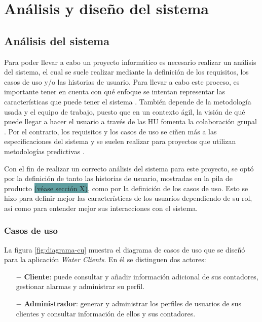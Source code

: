 \documentclass[pdftex,11pt,a4paper]{book}
\begin{document}

\chapter{Análisis y diseño del sistema}

\section{Análisis del sistema}

Para poder llevar a cabo un proyecto informático es necesario realizar un análisis del sistema, el cual se suele realizar mediante la definición de los requisitos, los casos de uso y/o las historias de usuario. Para llevar a cabo este proceso, es importante tener en cuenta con qué enfoque se intentan representar las características que puede tener el sistema \cite{bib:diferenciasHUCURequisitos}. También depende de la metodología usada y el equipo de trabajo, puesto que en un contexto ágil, la visión de qué puede llegar a hacer el usuario a través de las HU fomenta la colaboración grupal \cite{bib:diferenciasHUCURequisitos}.  Por el contrario, los requisitos y los casos de uso se ciñen más a las especificaciones del sistema y se suelen realizar para proyectos que utilizan metodologías predictivas \cite{bib:diferenciasHUCURequisitos}.


Con el fin de realizar un correcto análisis del sistema para este proyecto, se optó por la definición de tanto las historias de usuario, mostradas en la pila de producto \colorbox{CadetBlue}{ (véase sección X)}, como por la definición de los casos de uso. Esto se hizo para definir mejor las características de los usuarios dependiendo de su rol, así como para entender mejor sus interacciones con el sistema.

\subsection{Casos de uso}

La figura \ref{fig:diagrama-cu} muestra el diagrama de casos de uso que se diseñó para la aplicación \textit{Water Clients}. En él se distinguen dos actores:

\vspace{-4mm}
\begin{itemize}
\item [$-$] \textbf{Cliente}: puede consultar y añadir información adicional de sus contadores, gestionar alarmas y administrar su perfil. 
\item [$-$] \textbf{Administrador}: generar y administrar los perfiles de usuarios de sus clientes y consultar información de ellos y sus contadores.
\end{itemize}
\end{document}
